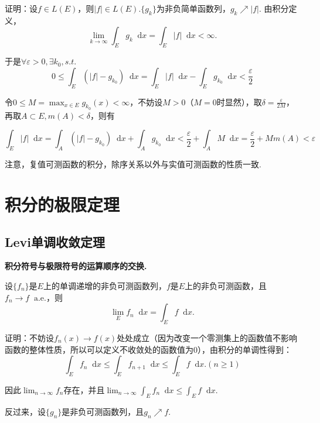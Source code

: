 \documentclass[bwprint, withoutpreface]{cumcmthesis}
\newcommand*{\dif}{\mathop{}\!\mathrm{d}}
\begin{document}
证明：设$f \in L(E)$，则$|f| \in L(E)$.$\{g_k\}$为非负简单函数列，$g_k \nearrow |f|$. 由积分定义，
\begin{equation*}
	\lim_{k \to \infty} \int_E g_k \dif x = \int_E |f| \dif x < \infty.
\end{equation*}

于是$\forall \varepsilon > 0, \exists k_0, s.t.$ \[ 0 \leqslant \int_E (|f| - g_{k_0}) \dif x = \int_E |f| \dif x - \int_E g_{k_0} \dif x < \frac{\varepsilon}{2} \]

令$0 \leqslant M = \max_{x \in E}{g_{k_0}(x)} < \infty$，不妨设$M > 0$（$M = 0$时显然），取$\delta = \frac{\varepsilon}{2M}$，再取$A \subset E, m(A) < \delta$，则有

\begin{equation*}
	\int_E |f| \dif x = \int_A (|f| - g_{k_0}) \dif x + \int_A g_{k_0} \dif x < \frac{\varepsilon}{2} + \int_A M \dif x = \frac{\varepsilon}{2} + Mm(A) < \varepsilon
\end{equation*}

注意，复值可测函数的积分，除序关系以外与实值可测函数的性质一致.

\section{积分的极限定理}
\subsection{Levi单调收敛定理}

\textbf{积分符号与极限符号的运算顺序的交换.}

设$\{f_n\}$是$E$上的单调递增的非负可测函数列，$f$是$E$上的非负可测函数，且$f_n \to f \mathop{} \! \mathrm{a.e.}$，则
\begin{equation*}
	\lim_E f_n \dif x = \int_E f \dif x.
\end{equation*}

证明：不妨设$f_n(x) \to f(x)$处处成立（因为改变一个零测集上的函数值不影响函数的整体性质，所以可以定义不收敛处的函数值为0），由积分的单调性得到：
\begin{equation*}
	\int_E f_n \dif x \leqslant \int_E f_{n + 1} \dif x \leqslant \int_E f \dif x. (n \geqslant 1)
\end{equation*}

因此$\lim_{n \to \infty}{f_n}$存在，并且$\lim_{n \to \infty}{\int_E f_n \dif x} \leqslant \int_E f \dif x.$

反过来，设$\{g_n\}$是非负可测函数列，且$g_n \nearrow f$.
\end{document}
